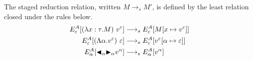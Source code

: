 \begin{definition}
	The staged reduction relation, written $M \longrightarrow_s M'$, is defined by 
	the least relation closed under the rules below.
		\begin{align*}
			E^A_\varepsilon [(\lambda x:\tau.M)\ v^\varepsilon]       & \longrightarrow_s E^A_\varepsilon[M[x\mapsto v^\varepsilon]]             \\
			E^A_\varepsilon [(\Lambda\alpha.v^\varepsilon)\ \varepsilon] & \longrightarrow_s E^A_\varepsilon[v^\varepsilon[\alpha\mapsto \varepsilon]] \\
			E^A_\alpha [\TBL_\alpha \TB_\alpha v^\alpha]        & \longrightarrow_s E^A_\alpha[v^\alpha]                             \\
		\end{align*}
\end{definition}

